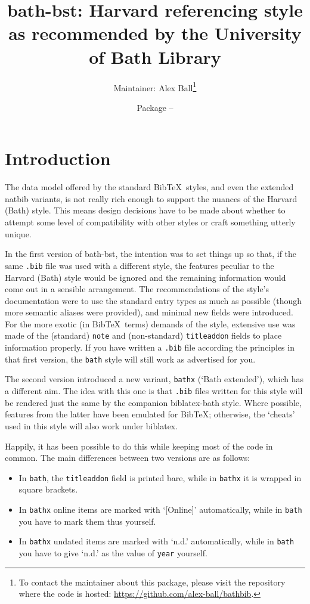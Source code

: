 \documentclass[10pt,a4paper]{article}
\title{bath-bst: Harvard referencing style as recommended by the University of Bath Library}
\author{%
  Maintainer: Alex Ball\thanks{%
    To contact the maintainer about this package, please visit the repository
    where the code is hosted: \url{https://github.com/alex-ball/bathbib}.%
  }%
}
\date{Package \UseVersionOf{\jobname.tex} --\printdateTeX{\UseDateOf{\jobname.tex}}}
\begin{document}
\maketitle

\section{Introduction}


The data model offered by the standard Bib\TeX\ styles, and even the extended
\textsf{natbib} variants, is not really rich enough to support the nuances of
the Harvard (Bath) style. This means design decisions have to be made about
whether to attempt some level of compatibility with other styles or craft
something utterly unique.

In the first version of \textsf{bath-bst}, the intention was to set things up
so that, if the same \texttt{.bib} file was used with a different style, the features
peculiar to the Harvard (Bath) style would be ignored and the remaining
information would come out in a sensible arrangement. The recommendations of
the style's documentation were to use the standard entry types as much as
possible (though more semantic aliases were provided), and minimal new fields
were introduced. For the more exotic (in Bib\TeX\ terms) demands of the style,
extensive use was made of the (standard) \texttt{note} and (non-standard)
\texttt{titleaddon} fields to place information properly. If you have written
a \texttt{.bib} file according the principles in that first version, the \texttt{bath}
style will still work as advertised for you.

The second version introduced a new variant, \texttt{bathx} (`Bath extended'),
which has a different aim. The idea with this one is that \texttt{.bib} files written
for this style will be rendered just the same by the companion
\textsf{biblatex-bath} style. Where possible, features from the latter have
been emulated for Bib\TeX; otherwise, the `cheats' used in this style will
also work under \textsf{biblatex}.

Happily, it has been possible to do this while keeping most of the code in
common. The main differences between two versions are as follows:

\begin{itemize}
\item
  In \texttt{bath}, the \texttt{titleaddon} field is printed bare, while
  in \texttt{bathx} it is wrapped in square brackets.
\item
  In \texttt{bathx} online items are marked with `[Online]' automatically,
  while in \texttt{bath} you have to mark them thus yourself.
\item
  In \texttt{bathx} undated items are marked with `n.d.' automatically,
  while in \texttt{bath} you have to give `n.d.' as the value of \texttt{year}
  yourself.
\end{itemize}
\end{document}
